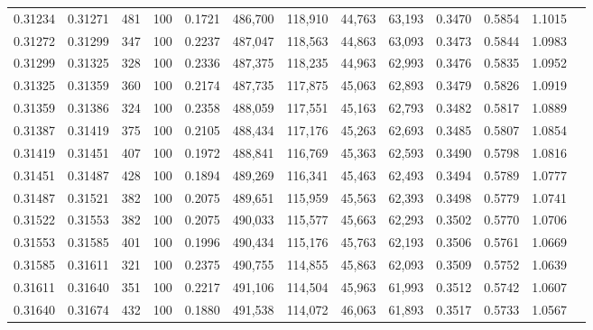 \begin{tabular}{rrrrrrrrrrrrr}
0.31234 & 0.31271 &   481 & 100 &                                     0.1721 & 486,700 & 118,910 &  44,763 &  63,193 & 0.3470 & 0.5854 & 1.1015 \\
0.31272 & 0.31299 &   347 & 100 &                                     0.2237 & 487,047 & 118,563 &  44,863 &  63,093 & 0.3473 & 0.5844 & 1.0983 \\
0.31299 & 0.31325 &   328 & 100 &                                     0.2336 & 487,375 & 118,235 &  44,963 &  62,993 & 0.3476 & 0.5835 & 1.0952 \\
0.31325 & 0.31359 &   360 & 100 &                                     0.2174 & 487,735 & 117,875 &  45,063 &  62,893 & 0.3479 & 0.5826 & 1.0919 \\
0.31359 & 0.31386 &   324 & 100 &                                     0.2358 & 488,059 & 117,551 &  45,163 &  62,793 & 0.3482 & 0.5817 & 1.0889 \\
0.31387 & 0.31419 &   375 & 100 &                                     0.2105 & 488,434 & 117,176 &  45,263 &  62,693 & 0.3485 & 0.5807 & 1.0854 \\
0.31419 & 0.31451 &   407 & 100 &                                     0.1972 & 488,841 & 116,769 &  45,363 &  62,593 & 0.3490 & 0.5798 & 1.0816 \\
0.31451 & 0.31487 &   428 & 100 &                                     0.1894 & 489,269 & 116,341 &  45,463 &  62,493 & 0.3494 & 0.5789 & 1.0777 \\
0.31487 & 0.31521 &   382 & 100 &                                     0.2075 & 489,651 & 115,959 &  45,563 &  62,393 & 0.3498 & 0.5779 & 1.0741 \\
0.31522 & 0.31553 &   382 & 100 &                                     0.2075 & 490,033 & 115,577 &  45,663 &  62,293 & 0.3502 & 0.5770 & 1.0706 \\
0.31553 & 0.31585 &   401 & 100 &                                     0.1996 & 490,434 & 115,176 &  45,763 &  62,193 & 0.3506 & 0.5761 & 1.0669 \\
0.31585 & 0.31611 &   321 & 100 &                                     0.2375 & 490,755 & 114,855 &  45,863 &  62,093 & 0.3509 & 0.5752 & 1.0639 \\
0.31611 & 0.31640 &   351 & 100 &                                     0.2217 & 491,106 & 114,504 &  45,963 &  61,993 & 0.3512 & 0.5742 & 1.0607 \\
0.31640 & 0.31674 &   432 & 100 &                                     0.1880 & 491,538 & 114,072 &  46,063 &  61,893 & 0.3517 & 0.5733 & 1.0567 \\

\end{tabular}
